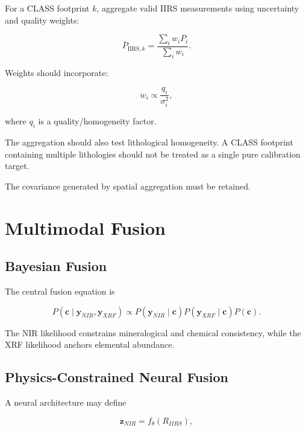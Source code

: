 \documentclass[11pt,a4paper]{article}
\begin{document}
For a CLASS footprint $k$, aggregate valid IIRS measurements using uncertainty and quality weights:

\begin{equation}
\bar{P}_{\mathrm{IIRS},k}
=
\frac{
\sum_i w_i P_i
}{
\sum_iw_i
}.
\end{equation}

Weights should incorporate:

\begin{equation}
w_i
\propto
\frac{
q_i
}{
\sigma_i^2
},
\end{equation}

where $q_i$ is a quality/homogeneity factor.

The aggregation should also test lithological homogeneity. A CLASS footprint containing multiple lithologies should not be treated as a single pure calibration target.

The covariance generated by spatial aggregation must be retained.

\section{Multimodal Fusion}

\subsection{Bayesian Fusion}

The central fusion equation is

\begin{equation}
P(\mathbf{c}\mid
\mathbf{y}_{NIR},
\mathbf{y}_{XRF})
\propto
P(\mathbf{y}_{NIR}\mid\mathbf{c})
P(\mathbf{y}_{XRF}\mid\mathbf{c})
P(\mathbf{c}).
\end{equation}

The NIR likelihood constrains mineralogical and chemical consistency, while the XRF likelihood anchors elemental abundance.

\subsection{Physics-Constrained Neural Fusion}

A neural architecture may define

\begin{equation}
\mathbf{z}_{NIR}
=
f_\theta(R_{IIRS}),
\end{equation}
\end{document}
